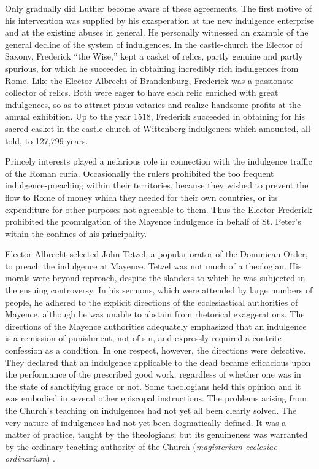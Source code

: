 Only gradually did Luther become aware of these agreements. The
first motive of his intervention was supplied by his exasperation
at the new indulgence enterprise and at the existing abuses in general.
He personally witnessed an example of the general decline of the
system of indulgences. In the castle-church the Elector of Saxony,
Frederick “the Wise,” kept a casket of relics, partly genuine
and partly spurious, for which he succeeded in obtaining incredibly
rich indulgences from Rome. Like the Elector Albrecht of Brandenburg, Frederick
was a passionate collector of relics. Both were eager
to have each relic enriched with great indulgences, so as to attract
pious votaries and realize handsome profits at the annual exhibition.
Up to the year 1518, Frederick succeeded in obtaining for his
sacred casket in the castle-church of Wittenberg indulgences which
amounted, all told, to 127,799 years.

Princely interests played a nefarious role in connection with the
indulgence traffic of the Roman curia. Occasionally the rulers prohibited
the too frequent indulgence-preaching within their territories, because
they wished to prevent the flow to Rome of money
which they needed for their own countries, or its expenditure for
other purposes not agreeable to them. Thus the Elector Frederick
prohibited the promulgation of the Mayence indulgence in behalf
of St. Peter’s within the confines of his principality.

Elector Albrecht selected John Tetzel, a popular orator of the
Dominican Order, to preach the indulgence at Mayence. Tetzel was
not much of a theologian. His morals were beyond reproach, despite
the slanders to which he was subjected in the ensuing controversy. In his
sermons, which were attended by large numbers of
people, he adhered to the explicit directions of the ecclesiastical
authorities of Mayence, although he was unable to abstain from
rhetorical exaggerations. The directions of the Mayence authorities adequately
emphasized that an indulgence is a remission of punishment,
not of sin, and expressly required a contrite confession as a
condition. In one respect, however, the directions were defective. They
declared that an indulgence applicable to the dead became efficacious
upon the performance of the prescribed good work, regardless of
whether one was in the state of sanctifying grace or not. Some theologians
held this opinion and it was embodied in several other episcopal
instructions. The problems arising from the Church’s teaching on indulgences
had not yet all been clearly solved. The very nature of
indulgences had not yet been dogmatically defined. It was a matter of
practice, taught by the theologians; but its genuineness was warranted
by the ordinary teaching authority of the Church (\textit{magisterium ecclesiae
ordinarium}) .


